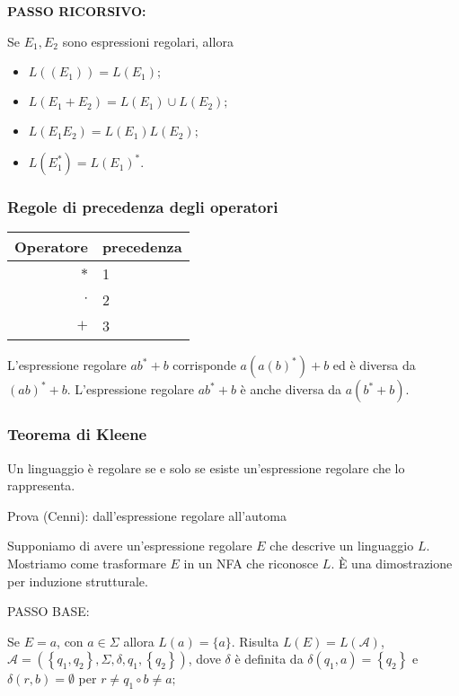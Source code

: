 \textbf{PASSO RICORSIVO:}

Se $E_{1}, E_{2}$ sono espressioni regolari, allora
\begin{itemize}
    \item $L\left(\left(E_{1}\right)\right)=L\left(E_{1}\right) ;$
    \item $L\left(E_{1}+E_{2}\right)=L\left(E_{1}\right) \cup L\left(E_{2}\right) ;$
    \item $L\left(E_{1} E_{2}\right)=L\left(E_{1}\right) L\left(E_{2}\right) ;$
    \item $L\left(E_{1}^{*}\right)=L\left(E_{1}\right)^{*} .$
\end{itemize}

\subsubsection{Regole di precedenza degli operatori}
\vspace{5mm}
\begin{center}
    \begin{tabular}{|r|l|}
\hline Operatore & precedenza \\
\hline$*$ & 1 \\
$\cdot$ & 2 \\
$+$ & 3 \\
\hline
\end{tabular}
\end{center}

\vspace{5mm}

L'espressione regolare $a b^{*}+b$ corrisponde $a\left(a(b)^{*}\right)+b$ ed è diversa da $(a b)^{*}+b$.
L'espressione regolare $a b^{*}+b$ è anche diversa da $a\left(b^{*}+b\right)$.

\subsubsection{Teorema di Kleene}

Un linguaggio è regolare se e solo se esiste un'espressione regolare
che lo rappresenta.

Prova (Cenni): dall'espressione regolare all'automa


Supponiamo di avere un'espressione regolare $E$ che descrive un
linguaggio $L$. Mostriamo come trasformare $E$ in un NFA che
riconosce $L$.
È una dimostrazione per induzione strutturale.

PASSO BASE:

Se $E=a$, con $a \in \Sigma$ allora $L(a)=\{a\}$. Risulta $L(E)=L(\mathcal{A})$,
$\mathcal{A}=\left(\left\{q_{1}, q_{2}\right\}, \Sigma, \delta, q_{1},\left\{q_{2}\right\}\right)$, dove $\delta$ è definita da
$\delta\left(q_{1}, a\right)=\left\{q_{2}\right\}$ e $\delta(r, b)=\emptyset$ per $r \neq q_{1} \circ b \neq a ;$

